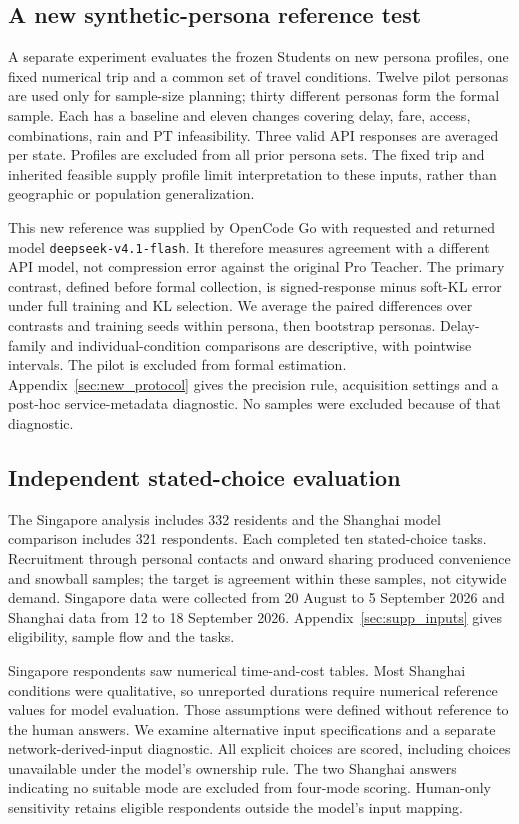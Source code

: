 \subsection{A new synthetic-persona reference test}
\label{sec:new_reference_design}
A separate experiment evaluates the frozen Students on new persona profiles, one fixed numerical trip and a common set of travel conditions. Twelve pilot personas are used only for sample-size planning; thirty different personas form the formal sample. Each has a baseline and eleven changes covering delay, fare, access, combinations, rain and PT infeasibility. Three valid API responses are averaged per state. Profiles are excluded from all prior persona sets. The fixed trip and inherited feasible supply profile limit interpretation to these inputs, rather than geographic or population generalization.

This new reference was supplied by OpenCode Go with requested and returned model \texttt{deepseek-v4.1-flash}. It therefore measures agreement with a different API model, not compression error against the original Pro Teacher. The primary contrast, defined before formal collection, is signed-response minus soft-KL error under full training and KL selection. We average the paired differences over contrasts and training seeds within persona, then bootstrap personas. Delay-family and individual-condition comparisons are descriptive, with pointwise intervals. The pilot is excluded from formal estimation. Appendix~\ref{sec:new_protocol} gives the precision rule, acquisition settings and a post-hoc service-metadata diagnostic. No samples were excluded because of that diagnostic.

\subsection{Independent stated-choice evaluation}
\label{sec:human_design}
The Singapore analysis includes 332 residents and the Shanghai model comparison includes 321 respondents. Each completed ten stated-choice tasks. Recruitment through personal contacts and onward sharing produced convenience and snowball samples; the target is agreement within these samples, not citywide demand. Singapore data were collected from 20 August to 5 September 2026 and Shanghai data from 12 to 18 September 2026. Appendix~\ref{sec:supp_inputs} gives eligibility, sample flow and the tasks.

Singapore respondents saw numerical time-and-cost tables. Most Shanghai conditions were qualitative, so unreported durations require numerical reference values for model evaluation. Those assumptions were defined without reference to the human answers. We examine alternative input specifications and a separate network-derived-input diagnostic. All explicit choices are scored, including choices unavailable under the model's ownership rule. The two Shanghai answers indicating no suitable mode are excluded from four-mode scoring. Human-only sensitivity retains eligible respondents outside the model's input mapping.

